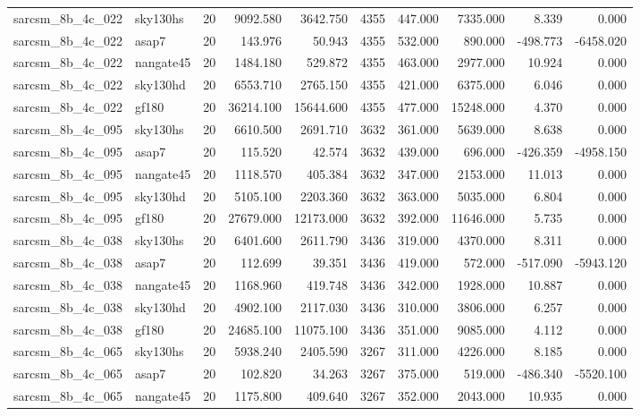 \begin{tabular}{llrrrrrrrr}
sarcsm\_8b\_4c\_022 & sky130hs & 20 & 9092.580 & 3642.750 & 4355 & 447.000 & 7335.000 & 8.339 & 0.000 \\
sarcsm\_8b\_4c\_022 & asap7 & 20 & 143.976 & 50.943 & 4355 & 532.000 & 890.000 & -498.773 & -6458.020 \\
sarcsm\_8b\_4c\_022 & nangate45 & 20 & 1484.180 & 529.872 & 4355 & 463.000 & 2977.000 & 10.924 & 0.000 \\
sarcsm\_8b\_4c\_022 & sky130hd & 20 & 6553.710 & 2765.150 & 4355 & 421.000 & 6375.000 & 6.046 & 0.000 \\
sarcsm\_8b\_4c\_022 & gf180 & 20 & 36214.100 & 15644.600 & 4355 & 477.000 & 15248.000 & 4.370 & 0.000 \\
sarcsm\_8b\_4c\_095 & sky130hs & 20 & 6610.500 & 2691.710 & 3632 & 361.000 & 5639.000 & 8.638 & 0.000 \\
sarcsm\_8b\_4c\_095 & asap7 & 20 & 115.520 & 42.574 & 3632 & 439.000 & 696.000 & -426.359 & -4958.150 \\
sarcsm\_8b\_4c\_095 & nangate45 & 20 & 1118.570 & 405.384 & 3632 & 347.000 & 2153.000 & 11.013 & 0.000 \\
sarcsm\_8b\_4c\_095 & sky130hd & 20 & 5105.100 & 2203.360 & 3632 & 363.000 & 5035.000 & 6.804 & 0.000 \\
sarcsm\_8b\_4c\_095 & gf180 & 20 & 27679.000 & 12173.000 & 3632 & 392.000 & 11646.000 & 5.735 & 0.000 \\
sarcsm\_8b\_4c\_038 & sky130hs & 20 & 6401.600 & 2611.790 & 3436 & 319.000 & 4370.000 & 8.311 & 0.000 \\
sarcsm\_8b\_4c\_038 & asap7 & 20 & 112.699 & 39.351 & 3436 & 419.000 & 572.000 & -517.090 & -5943.120 \\
sarcsm\_8b\_4c\_038 & nangate45 & 20 & 1168.960 & 419.748 & 3436 & 342.000 & 1928.000 & 10.887 & 0.000 \\
sarcsm\_8b\_4c\_038 & sky130hd & 20 & 4902.100 & 2117.030 & 3436 & 310.000 & 3806.000 & 6.257 & 0.000 \\
sarcsm\_8b\_4c\_038 & gf180 & 20 & 24685.100 & 11075.100 & 3436 & 351.000 & 9085.000 & 4.112 & 0.000 \\
sarcsm\_8b\_4c\_065 & sky130hs & 20 & 5938.240 & 2405.590 & 3267 & 311.000 & 4226.000 & 8.185 & 0.000 \\
sarcsm\_8b\_4c\_065 & asap7 & 20 & 102.820 & 34.263 & 3267 & 375.000 & 519.000 & -486.340 & -5520.100 \\
sarcsm\_8b\_4c\_065 & nangate45 & 20 & 1175.800 & 409.640 & 3267 & 352.000 & 2043.000 & 10.935 & 0.000 \\

\end{tabular}
